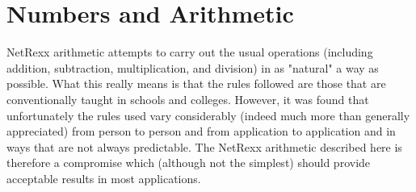 \chapter{Numbers and Arithmetic}\label{"id"}
\index{,}
\index{,}
\index{,}
\index{,}
\index{,}
 NetRexx arithmetic attempts to carry out the usual operations
(including addition, subtraction, multiplication, and division) in as
"natural" a way as possible.
What this really means is that the rules followed are those that are
conventionally taught in schools and colleges.
However, it was found that unfortunately the rules used vary
considerably (indeed much more than generally appreciated) from person
to person and from application to application and in ways that are not
always predictable.
The NetRexx arithmetic described here is therefore a compromise which
(although not the simplest) should provide acceptable results in most
applications.
\subsection{}\label{"id"}
 
